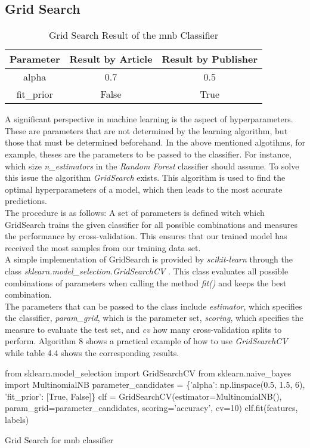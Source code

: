 \documentclass[a4paper, 11pt,titlepage,oneside,openany]{book}
\begin{document}
\subsection{Grid Search}
\begin{table}[h]
	\centering
		\begin{tabular}{c|c|c}
			\toprule
			Parameter & Result by Article & Result by Publisher \\
			\midrule
			alpha & 0.7 & 0.5  \\
			fit\_prior & False & True \\
			\bottomrule
		\end{tabular}
		\caption{Grid Search Result of the \gls{mnb} Classifier}
\end{table}
\noindent A significant perspective in machine learning is the aspect of hyperparameters. These are parameters that are not determined by the learning algorithm, but those that must be determined beforehand. In the above mentioned algotihms, for example, theses are the parameters to be passed to the classifier. For instance, which size \textit{n\_estimators} in the \textit{Random Forest} classifier should assume. To solve this issue the algorithm \textit{GridSearch} exists. This algorithm is used to find the optimal hyperparameters of a model, which then leads to the most accurate predictions. \\
\noindent The procedure is as follows: A set of parameters is defined witch which GridSearch trains the given classifier for all possible combinations and measures the performance by cross-validation. This ensures that our trained model has received the most samples from our training data set. \\
\noindent A simple implementation of GridSearch is provided by \textit{scikit-learn} through the class \textit{sklearn.model\_selection.GridSearchCV} \cite{codegridsearch}. This class evaluates all possible combinations of parameters when calling the method \textit{fit()} and keeps the best combination. \\
\noindent The parameters that can be passed to the class include \textit{estimator}, which specifies the classifier, \textit{param\_grid}, which is the parameter set, \textit{scoring}, which specifies the measure to evaluate the test set, and \textit{cv} how many cross-validation splits to perform. Algorithm 8 shows a practical example of how to use \textit{GridSearchCV} while table 4.4 shows the corresponding results. \\
\begin{algorithm}[h]
	\DontPrintSemicolon
	from sklearn.model\_selection import GridSearchCV\;
	from sklearn.naive\_bayes import MultinomialNB\;
	\BlankLine
	    parameter\_candidates = \{'alpha': np.linspace(0.5, 1.5, 6), 'fit\_prior': [True, False]\}\;
	    clf = GridSearchCV(estimator=MultinomialNB(), param\_grid=parameter\_candidates, scoring='accuracy', cv=10)\;
	clf.fit(features, labels)\;
	\caption{Grid Search for \gls{mnb} classifier}
\end{algorithm}
\newpage
\end{document}
